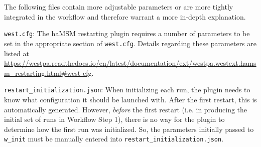 The following files contain more adjustable parameters or are more tightly integrated in the workflow and therefore warrant a more in-depth explanation.

\verb|west.cfg|: The haMSM restarting plugin requires a number of parameters to be set in the appropriate section of \verb|west.cfg|. 
Details regarding these parameters are listed at {\url{https://westpa.readthedocs.io/en/latest/documentation/ext/westpa.westext.hamsm_restarting.html#west-cfg}}.

\verb|restart_initialization.json|: When initializing each run, the plugin needs to know what configuration it should be launched with. 
After the first restart, this is automatically generated. 
However, \textit{before} the first restart (i.e. in producing the initial set of runs in Workflow Step 1), there is no way for the plugin to determine how the first run was initialized. 
So, the parameters initially passed to \verb|w_init| must be manually entered into \verb|restart_initialization.json|.

